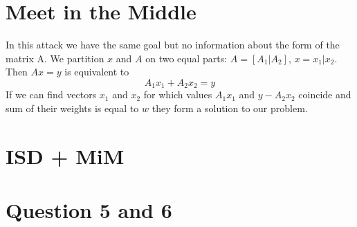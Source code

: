 \documentclass[12pt]{article}
\begin{document}
\section{Meet in the Middle}
In this attack we have the same goal but no information about the form of the matrix A.
We partition $x$ and $A$ on two equal parts: $A = [A_1 | A_2]$, $x = x_1 | x_2$.
Then $Ax = y$ is equivalent to
\[
    A_1x_1 + A_2x_2 = y
\]
If we can find vectors $x_1$ and $x_2$ for which values $A_1x_1$ and $y - A_2x_2$ coincide
and sum of their weights is equal to $w$ they form a solution to our problem.


\section{ISD + MiM}

\section{Question 5 and 6}




\end{document}
